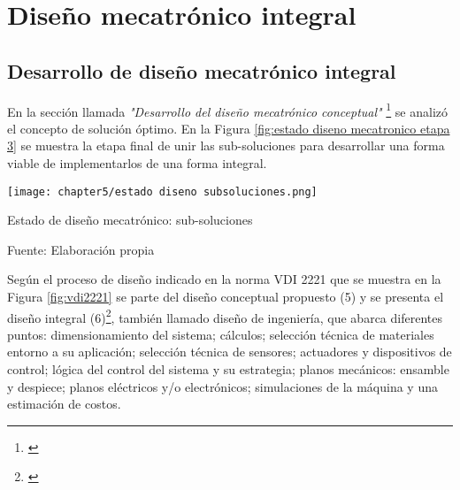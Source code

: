 
\pagestyle{myportland}
\doublespacing
\chapter[----- Diseño mecatrónico integral]{Diseño mecatrónico integral}
\thispagestyle{myportland}


\section{Desarrollo de diseño mecatrónico integral}
\label{sec:desarrollo de diseno mecatronico integral}

En la sección llamada \textit{"Desarrollo del diseño mecatrónico conceptual"} \footnote{\cite{DiazVergara2020}} se analizó el concepto de solución óptimo. En la Figura \ref{fig:estado diseno mecatronico etapa 3} se muestra la etapa final de unir las sub-soluciones para desarrollar una forma viable de implementarlos de una forma integral.

\begin{myfigure}[H]
	\centering
	\texttt{[image: chapter5/estado diseno subsoluciones.png]}
	\caption{Estado de diseño mecatrónico: sub-soluciones}
	\begin{myflushleftportland}
		Fuente: Elaboración propia
	\end{myflushleftportland}
	\label{fig:estado diseno mecatronico etapa 3}
\end{myfigure}

Según el proceso de diseño indicado en la norma VDI 2221 que se muestra en la Figura \ref{fig:vdi2221} se parte del diseño conceptual propuesto (5) y se presenta el diseño integral (6)\footnote{\cite{Pahl2007}}, también llamado diseño de ingeniería, que abarca diferentes puntos: dimensionamiento del sistema; cálculos; selección técnica de materiales entorno a su aplicación; selección técnica de sensores; actuadores y dispositivos de control; lógica del control del sistema y su estrategia; planos mecánicos: ensamble y despiece; planos eléctricos y/o electrónicos; simulaciones de la máquina y una estimación de costos.

